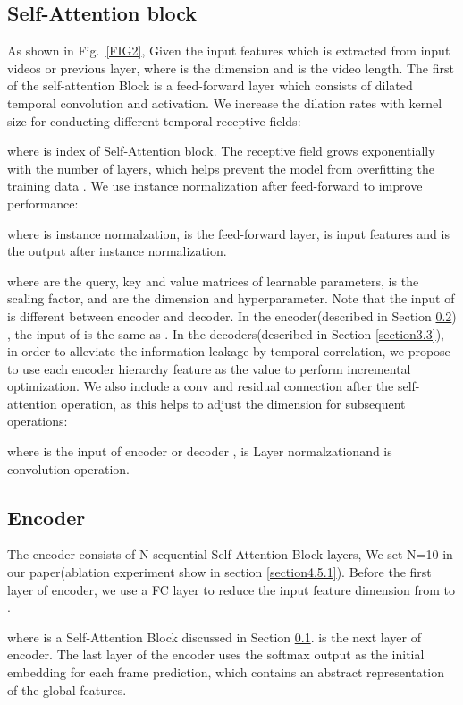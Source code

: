 \documentclass[runningheads]{llncs}
\begin{document}
\subsection{Self-Attention block}\label{section3.1}
\par{
	As shown in Fig.~\ref{FIG2}, Given the input features  which is extracted from input videos or previous  layer, where  is the dimension and  is the video length. The first of the self-attention Block is a feed-forward layer which consists of  dilated temporal convolution and  activation. We increase the dilation rates with kernel size  for conducting different temporal receptive fields:
}

\noindent where  is index of Self-Attention block. The receptive field grows exponentially with the number of layers, which helps prevent the model from overfitting the training data \cite{lea2017temporal}. We use instance normalization after feed-forward to improve performance:

\noindent where  is instance normalzation,  is the feed-forward layer,  is input features and  is the output after instance normalization.


\noindent where  are the query, key and value matrices of learnable parameters,  is the scaling factor,  and  are the dimension and hyperparameter. Note that the input of  is different between encoder and decoder. In the encoder(described in Section \ref{section3.2}) , the input of  is the same as . In the decoders(described in Section \ref{section3.3}), in order to alleviate the information leakage by temporal correlation, we propose to use each encoder hierarchy feature as the  value to perform incremental optimization. We also include a  conv and residual connection after the self-attention operation, as this helps to adjust the dimension for subsequent operations:

\noindent where  is the input of encoder or decoder ,  is Layer normalzationand  is  convolution operation.
\subsection{Encoder}\label{section3.2}
\par{
	The encoder consists of N sequential Self-Attention Block layers, We set N=10 in our paper(ablation experiment show in section \ref{section4.5.1}). Before the first layer of encoder, we use a FC layer to reduce the input feature dimension from  to .
}

\noindent where  is a Self-Attention Block discussed in Section \ref{section3.1}.  is the next layer of encoder. The last layer of the encoder uses the softmax output as the initial embedding for each frame prediction, which contains an abstract representation of the global features. 
\end{document}
